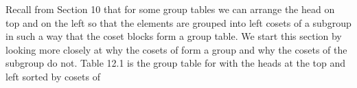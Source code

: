 \documentclass[11pt,oneside]{article}
\begin{document}
\fi
\renewcommand{\BookFooter}{Section 12 Factor Groups}
\ifdefined\BookMaster\else\setcounter{page}{113}\fi

\BookNarrativetrue

\begin{BookBody}


\noindent Recall from Section 10 that for some group tables we can arrange the head on top and on the left so that the elements are grouped into left cosets of a subgroup in such a way that the coset blocks form a group table. We start this section by looking more closely at why the cosets of  form a group and why the cosets of the subgroup  do not. Table 12.1 is the group table for  with the heads at the top and left sorted by cosets of 


\end{BookBody}
\end{document}
